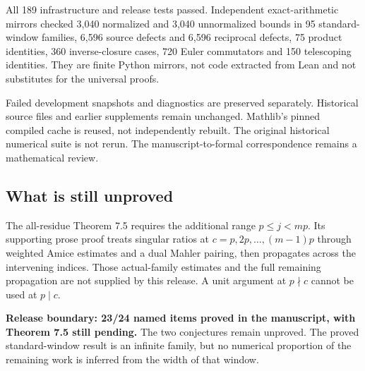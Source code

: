 All 189 infrastructure and release tests passed. Independent exact-arithmetic mirrors checked 3,040 normalized and 3,040 unnormalized bounds in 95 standard-window families, 6,596 source defects and 6,596 reciprocal defects, 75 product identities, 360 inverse-closure cases, 720 Euler commutators and 150 telescoping identities. They are finite Python mirrors, not code extracted from Lean and not substitutes for the universal proofs.

Failed development snapshots and diagnostics are preserved separately. Historical source files and earlier supplements remain unchanged. Mathlib's pinned compiled cache is reused, not independently rebuilt. The original historical numerical suite is not rerun. The manuscript-to-formal correspondence remains a mathematical review.

\subsection*{What is still unproved}
The all-residue Theorem 7.5 requires the additional range $p\le j<mp$. Its supporting prose proof treats singular ratios at $c=p,2p,\ldots,(m-1)p$ through weighted Amice estimates and a dual Mahler pairing, then propagates across the intervening indices. Those actual-family estimates and the full remaining propagation are not supplied by this release. A unit argument at $p\nmid c$ cannot be used at $p\mid c$.

\textbf{Release boundary: 23/24 named items proved in the manuscript, with Theorem 7.5 still pending.} The two conjectures remain unproved. The proved standard-window result is an infinite family, but no numerical proportion of the remaining work is inferred from the width of that window.
